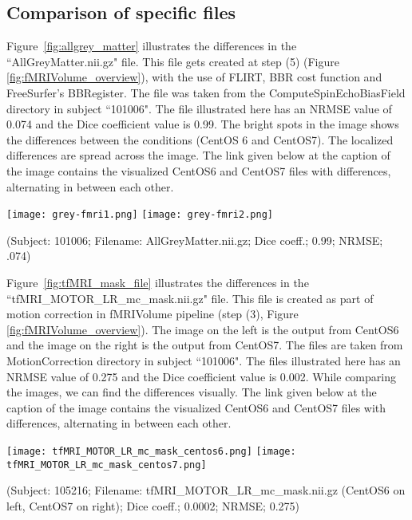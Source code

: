 \subsection{Comparison of specific files}
Figure~\ref{fig:allgrey_matter} illustrates the differences in the ``AllGreyMatter.nii.gz" file. This file gets created at step (5) (Figure \ref{fig:fMRIVolume_overview}), with the use of FLIRT, BBR cost function and FreeSurfer's BBRegister. The file was taken from the ComputeSpinEchoBiasField directory in subject ``101006". The file illustrated here has an NRMSE value of 0.074 and the Dice coefficient value is 0.99. The bright spots in the image shows the differences between the conditions (CentOS 6 and CentOS7). The localized differences are spread across the image. The link given below at the caption of the image contains the visualized CentOS6 and CentOS7 files with differences, alternating in between each other.

\begin{center}
\texttt{[image: grey-fmri1.png]}%
\texttt{[image: grey-fmri2.png]}%
\caption*{(Subject: 101006; Filename: AllGreyMatter.nii.gz; Dice coeff.; 0.99; NRMSE; .074)}
\label{fig:allgrey_matter}
\end{center}

Figure~\ref{fig:tfMRI_mask_file} illustrates the differences in the ``tfMRI\_MOTOR\_LR\_mc\_mask.nii.gz" file. This file is created as part of motion correction in fMRIVolume pipeline (step (3), Figure \ref{fig:fMRIVolume_overview}). The image on the left is the output from CentOS6 and the image on the right is the output from CentOS7. The files are taken from MotionCorrection directory in subject ``101006". The files illustrated here has an NRMSE value of 0.275 and the Dice coefficient value is 0.002. While comparing the images, we can find the differences visually.
The link given below at the caption of the image contains the visualized CentOS6 and CentOS7 files with differences, alternating in between each other.

\begin{center}
\texttt{[image: tfMRI\_MOTOR\_LR\_mc\_mask\_centos6.png]}%
\texttt{[image: tfMRI\_MOTOR\_LR\_mc\_mask\_centos7.png]}
\caption*{(Subject: 105216; Filename: tfMRI\_MOTOR\_LR\_mc\_mask.nii.gz (CentOS6 on left, CentOS7 on right); Dice coeff.; 0.0002; NRMSE; 0.275)}
\label{fig:tfMRI_mask_file}
\end{center}

